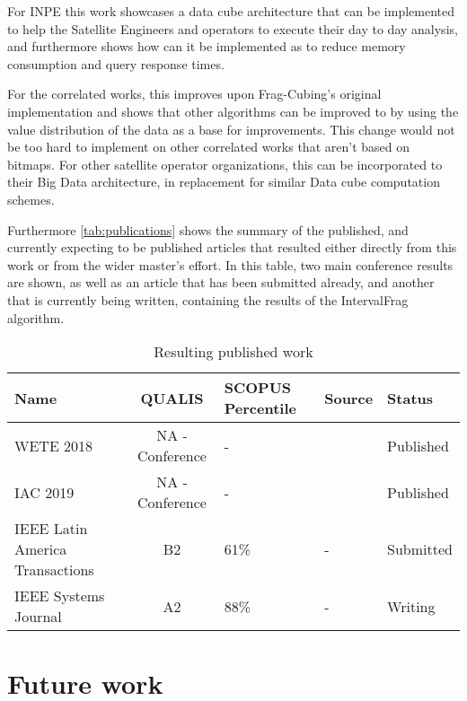 For INPE this work showcases a data cube architecture that can be implemented to help the Satellite Engineers and operators to execute their day to day analysis, and furthermore shows how can it be implemented as to reduce memory consumption and query response times.

For the correlated works, this improves upon Frag-Cubing's original implementation and shows that other algorithms can be improved to by using the value distribution of the data as a base for improvements.
This change would not be too hard to implement on other correlated works that aren't based on bitmaps.
For other satellite operator organizations, this can be incorporated to their Big Data architecture, in replacement for similar Data cube computation schemes.

Furthermore \autoref{tab:publications} shows the summary of the published, and currently expecting to be published articles that resulted either directly from this work or from the wider master's effort.
In this table, two main conference results are shown, as well as an article that has been submitted already, and another that is currently being written, containing the results of the IntervalFrag algorithm.

\begin{table}[!ht]
  \begin{center}
    \caption{Resulting published work}\label{tab:publications}
    \begin{tabular}{|C{2.3cm}|c|C{2.2cm}|C{2.4cm}|C{2.9cm}|}
      \hline
      \textbf{Name} &\bfseries QUALIS & \bfseries SCOPUS Percentile & \bfseries Source &\bfseries Status \\
      \hline
      WETE 2018 & NA - Conference & - & \cite{PereiraFerrSilv:2018:StApOL} & Published \\
      \hline
      IAC 2019 & NA - Conference & - & \cite{pereiraLessonsLearnedSystems2019} & Published \\
      \hline
      IEEE Latin America Transactions & B2 & 61\% & - & Submitted \\
      \hline
      IEEE Systems Journal & A2 & 88\% & - & Writing \\
      \hline
    \end{tabular}
  \end{center}
\end{table}

\section{Future work}\label{ch:concl:future}

